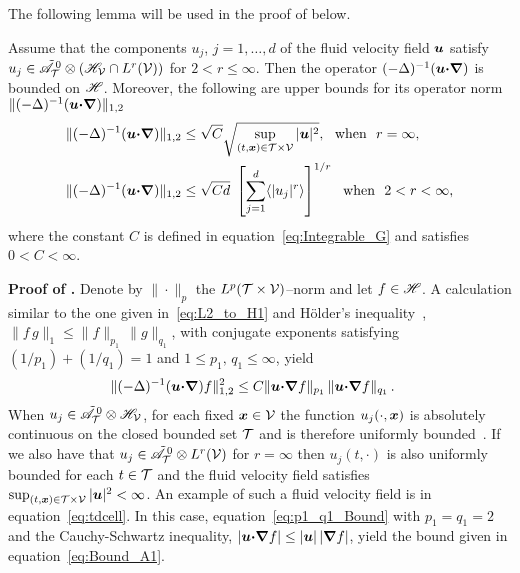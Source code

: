 \documentclass[amsa]{ipart}
\begin{document}
The following lemma will be used in the
proof of  below.
%
\begin{lemma}\label{lem:A_bounded}
%
Assume that the components $u_j$, $j=1,\ldots,d$ of the fluid velocity
field $\boldsymbol{u}$ satisfy $u_j\in\tilde{\mathscr{A}}^{\,0}_{\mathcal{T}}\otimes(\mathscr{H}_{\mathcal{V}}\cap
L^r(\mathcal{V}))$ for $2<r\leq\infty$. Then the operator
$(-\Delta)^{-1}(\boldsymbol{u}\mbox{\boldmath${\cdot}$}\mbox{\boldmath${\nabla}$})$ is bounded on $\mathscr{H}$. Moreover, the
following are upper bounds for its operator norm
$\|(-\Delta)^{-1}(\boldsymbol{u}\mbox{\boldmath${\cdot}$}\mbox{\boldmath${\nabla}$})\|_{1,2}$ 
%
\begin{align}
  \|(-\Delta)^{-1}(\vecu\bcdot\bnabla)\|_{1,2}
  &\leq\sqrt{C}\sqrt{\sup_{(t,\vecx)\in\Tc\times\Vc}|\vecu|^2},
  ~\text{ when }~ r=\infty,
  \label{eq:Bound_A1}  
  \\
  \|(-\Delta)^{-1}(\vecu\bcdot\bnabla)\|_{1,2}
  &\leq\sqrt{Cd}\;\left[\sum_{j=1}^d\langle|u_j|^r\rangle\right]^{1/r}
  ~\text{ when }~ 2<r<\infty,
  \label{eq:Bound_A2}
\end{align}
%
where the constant $C$ is defined in equation~\eqref{eq:Integrable_G}
and satisfies $0<C<\infty$. 
%
\end{lemma}
%



\textbf{Proof of .}\hspace{1ex}
%
Denote by $\|\cdot\|_p$ the $L^p(\mathcal{T}\times\mathcal{V})$--norm and let $f\in\mathscr{H}$. A
calculation similar to the one given 
in~\eqref{eq:L2_to_H1} and H{\"o}lder's
inequality~\cite{Folland:99:RealAnalysis}, 
$\|f\,g\|_1\leq\|f\|_{p_1}\,\|g\|_{q_1}$, with conjugate exponents
satisfying $(1/p_1)+(1/q_1)=1$ and $1\leq p_1,\,q_1\leq\infty$, yield
%
\begin{align}\label{eq:p1_q1_Bound}
  \|(-\Delta)^{-1}(\vecu\bcdot\bnabla)f\|^2_{1,2}
  &\leq C\|\vecu\bcdot\bnabla f\|_{p_1}\,\|\vecu\bcdot\bnabla f\|_{q_1}\,.
\end{align}
%
When $u_j\in\tilde{\mathscr{A}}^{\,0}_{\mathcal{T}}\otimes\mathscr{H}_{\mathcal{V}}$, for each fixed
$\boldsymbol{x}\in\mathcal{V}$ the function $u_j(\cdot,\boldsymbol{x})$ is absolutely continuous  on
the closed bounded set $\mathcal{T}$ and is therefore uniformly
bounded~\cite{Royden:1988:RA,BabyRudin:64}. If we 
also have that $u_j\in\tilde{\mathscr{A}}^{\,0}_{\mathcal{T}}\otimes L^r(\mathcal{V})$ for $r=\infty$ then
$u_j(t,\cdot)$ is also uniformly bounded for each $t\in\mathcal{T}$ and the fluid
velocity field satisfies $\sup_{(t,\boldsymbol{x})\in\mathcal{T}\times\mathcal{V}}|\boldsymbol{u}|^2<\infty$. An
example of such a fluid velocity field is in
equation~\eqref{eq:tdcell}. In this case,
equation~\eqref{eq:p1_q1_Bound} with 
$p_1=q_1=2$ and the Cauchy-Schwartz inequality,
$|\boldsymbol{u}\mbox{\boldmath${\cdot}$}\mbox{\boldmath${\nabla}$} f|\leq|\boldsymbol{u}|\,|\mbox{\boldmath${\nabla}$} f|$, yield the bound given in 
equation~\eqref{eq:Bound_A1}.
\end{document}
